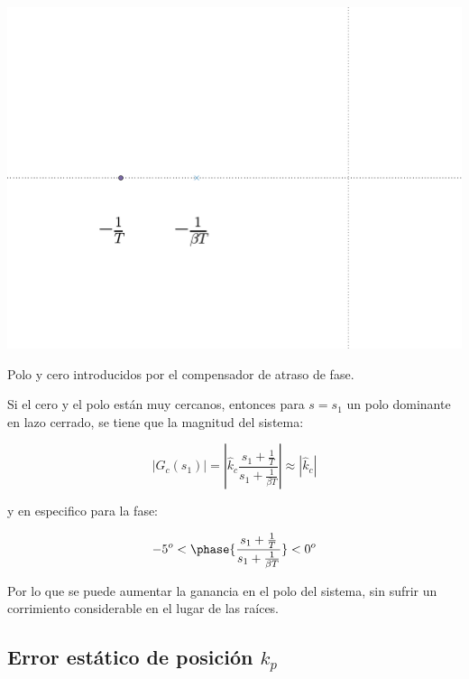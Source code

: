         \begin{marginfigure}
            \centering
            \includegraphics[width=\textwidth]{./imagenes/atrasopoloycero.pdf}
            \caption{\label{fig:atrasopoloycero}Polo y cero introducidos por el compensador de atraso de fase.}
        \end{marginfigure}

        Si el cero y el polo están muy cercanos, entonces para $s=s_1$ un polo dominante en lazo cerrado, se tiene que la magnitud del sistema:

        \begin{equation*}
            \left| G_c(s_1) \right| = \left| \hat{k}_c \frac{s_1 + \frac{1}{T}}{s_1 + \frac{1}{\beta  T}} \right| \approx \left| \hat{k}_c \right|
        \end{equation*}

        y en especifico para la fase:

        \begin{equation*}
            -5^o < \phase{\frac{s_1 + \frac{1}{T}}{s_1 + \frac{1}{\beta  T}}} < 0^o
        \end{equation*}

        Por lo que se puede aumentar la ganancia en el polo del sistema, sin sufrir un corrimiento considerable en el lugar de las raíces.


        \subsection{Error estático de posición $k_p$}

